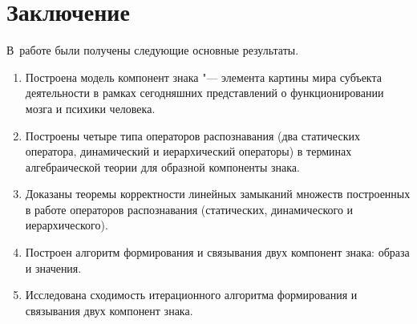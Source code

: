 \chapter*{Заключение}						%

В~работе были получены следующие основные результаты.

\begin{enumerate}
	\renewcommand\labelenumi{\theenumi.}
	\item Построена модель компонент знака "--- элемента картины мира субъекта деятельности в рамках сегодняшних представлений о функционировании мозга и психики человека.
	\item Построены четыре типа операторов распознавания (два статических оператора, динамический и иерархический операторы) в терминах алгебраической теории для образной компоненты знака.
	\item Доказаны теоремы корректности линейных замыканий множеств построенных в работе операторов распознавания (статических, динамического и иерархического).
	\item Построен алгоритм формирования и связывания двух компонент знака: образа и значения.
	\item Исследована сходимость итерационного алгоритма формирования и связывания двух компонент знака.
\end{enumerate}

\clearpage